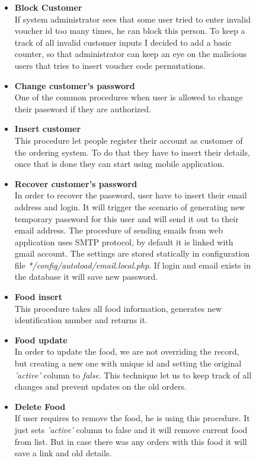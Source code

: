 \begin{figure}
\begin{itemize}
\item \textbf{Block Customer} 
\\
If system administrator sees that some user tried to enter invalid voucher id too many times, he can block this person. To keep a track of all invalid customer inputs I decided to add a basic counter, so that administrator can keep an eye on the malicious users that tries to insert voucher code permutations.

\item \textbf{Change customer's password}
\\
One of the common procedures when user is allowed to change their password if they are authorized.

\item \textbf{Insert customer}
\\
This procedure let people register their account as customer of the ordering system. To do that they have to insert their details, once that is done they can start using mobile application.

\item \textbf{Recover customer's password}
\\
In order to recover the password, user have to insert their email address and login. It will trigger the scenario of generating new temporary password for this user and will send it out to their email address. The procedure of sending emails from web application uses SMTP protocol, by default it is linked with gmail account. The settings are stored statically in configuration file \textit{*/config/autoload/email.local.php}. If login and email exists in the database it will save new password.


\item \textbf{Food insert}
\\
This procedure takes all food information, generates new identification number and returns it.


\item \textbf{Food update}
\\
In order to update the food, we are not overriding the record, but creating a new one with unique id and setting the original \textit{'active'} column to \textit{false}. This technique let us to keep track of all changes and prevent updates on the old orders.


\item \textbf{Delete Food}
\\
If user requires to remove the food, he is using this procedure. It just sets \textit{'active'} column to false and it will remove current food from list. But in case there was any orders with this food it will save a link and old details.



\end{itemize}
\end{figure}
